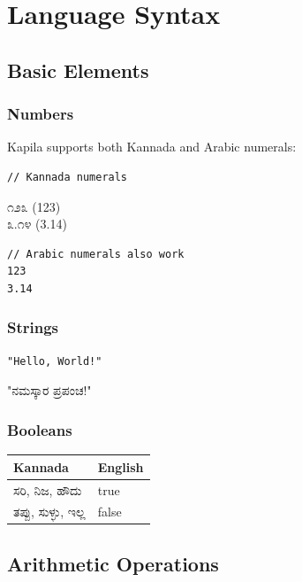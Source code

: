 \documentclass[11pt,a4paper]{report}
\newcommand{\kannada}[1]{{\kannadafont #1}}
\begin{document}
\chapter{Language Syntax}

\section{Basic Elements}

\subsection{Numbers}

Kapila supports both Kannada and Arabic numerals:

\begin{lstlisting}
// Kannada numerals
\end{lstlisting}
\kannada{೧೨೩} \quad (123)\\
\kannada{೩.೧೪} \quad (3.14)

\begin{lstlisting}
// Arabic numerals also work
123
3.14
\end{lstlisting}

\subsection{Strings}

\begin{lstlisting}
"Hello, World!"
\end{lstlisting}
"\kannada{ನಮಸ್ಕಾರ ಪ್ರಪಂಚ}!"

\subsection{Booleans}

\begin{tabular}{ll}
\toprule
Kannada & English \\
\midrule
\kannada{ಸರಿ}, \kannada{ನಿಜ}, \kannada{ಹೌದು} & true \\
\kannada{ತಪ್ಪು}, \kannada{ಸುಳ್ಳು}, \kannada{ಇಲ್ಲ} & false \\
\bottomrule
\end{tabular}

\section{Arithmetic Operations}
\end{document}

